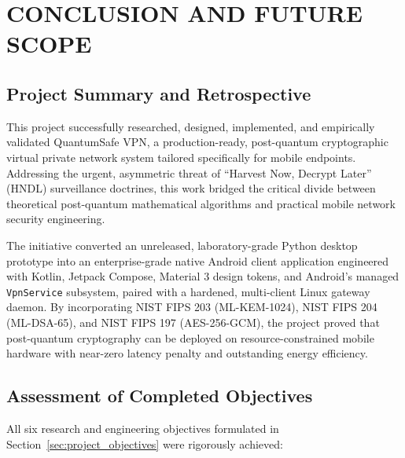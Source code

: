 
\chapter{CONCLUSION AND FUTURE SCOPE}
\label{chap:conclusion}

\section{Project Summary and Retrospective}
\label{sec:project_summary}

This project successfully researched, designed, implemented, and empirically validated QuantumSafe VPN, a production-ready, post-quantum cryptographic virtual private network system tailored specifically for mobile endpoints. Addressing the urgent, asymmetric threat of ``Harvest Now, Decrypt Later'' (HNDL) surveillance doctrines, this work bridged the critical divide between theoretical post-quantum mathematical algorithms and practical mobile network security engineering.

The initiative converted an unreleased, laboratory-grade Python desktop prototype into an enterprise-grade native Android client application engineered with Kotlin, Jetpack Compose, Material 3 design tokens, and Android's managed \texttt{VpnService} subsystem, paired with a hardened, multi-client Linux gateway daemon. By incorporating NIST FIPS 203 (ML-KEM-1024), NIST FIPS 204 (ML-DSA-65), and NIST FIPS 197 (AES-256-GCM), the project proved that post-quantum cryptography can be deployed on resource-constrained mobile hardware with near-zero latency penalty and outstanding energy efficiency.

\section{Assessment of Completed Objectives}
\label{sec:objectives_assessment}

All six research and engineering objectives formulated in Section~\ref{sec:project_objectives} were rigorously achieved:

